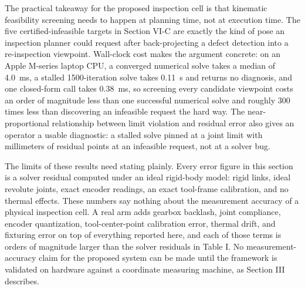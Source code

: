 \documentclass[conference]{IEEEtran}
\begin{document}
The practical takeaway for the proposed inspection cell is that kinematic feasibility screening needs to happen at planning time, not at execution time. The five certified-infeasible targets in Section VI-C are exactly the kind of pose an inspection planner could request after back-projecting a defect detection into a re-inspection viewpoint. Wall-clock cost makes the argument concrete: on an Apple M-series laptop CPU, a converged numerical solve takes a median of 4.0~ms, a stalled 1500-iteration solve takes 0.11~s and returns no diagnosis, and one closed-form call takes 0.38~ms, so screening every candidate viewpoint costs an order of magnitude less than one successful numerical solve and roughly 300 times less than discovering an infeasible request the hard way. The near-proportional relationship between limit violation and residual error also gives an operator a usable diagnostic: a stalled solve pinned at a joint limit with millimeters of residual points at an infeasible request, not at a solver bug.

The limits of these results need stating plainly. Every error figure in this section is a solver residual computed under an ideal rigid-body model: rigid links, ideal revolute joints, exact encoder readings, an exact tool-frame calibration, and no thermal effects. These numbers say nothing about the measurement accuracy of a physical inspection cell. A real arm adds gearbox backlash, joint compliance, encoder quantization, tool-center-point calibration error, thermal drift, and fixturing error on top of everything reported here, and each of those terms is orders of magnitude larger than the solver residuals in Table I. No measurement-accuracy claim for the proposed system can be made until the framework is validated on hardware against a coordinate measuring machine, as Section III describes.
\end{document}
